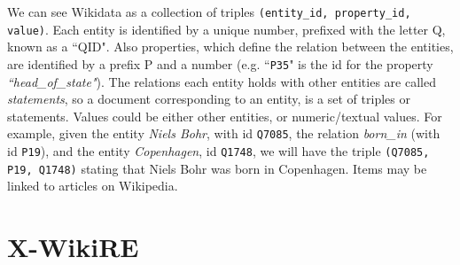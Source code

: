 

We can see Wikidata as a collection of triples \texttt{(entity\_id, property\_id, value)}. Each entity is identified by a unique number, prefixed with the letter Q, known as a ``QID". Also properties, which define the relation between the entities, are identified by a prefix P and a number (e.g. ``\texttt{P35}" is the id for the property \textit{``head\_of\_state"}). The relations each entity holds with other entities are called \textit{statements}, so a document corresponding to an entity, is a set of triples or statements. Values could be either other entities, or numeric/textual values.  For example, given the entity \textit{Niels Bohr}, with id \texttt{Q7085}, the relation \textit{born\_in} (with id \texttt{P19}), and the entity \textit{Copenhagen}, id \texttt{Q1748}, we will have the triple \texttt{(Q7085, P19, Q1748)} stating that Niels Bohr was born in Copenhagen. Items may be linked to articles on Wikipedia.



\section{X-WikiRE}
